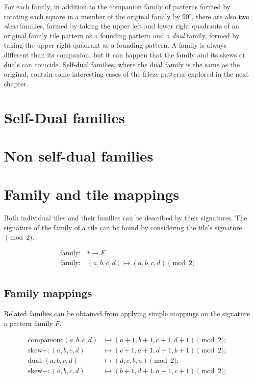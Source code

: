 \documentclass{tufte-book}
\begin{document}
\noindent
For each family, in addition to the companion family of patterns formed by rotating each square in a member of the original family by $90^{\circ}$,  there are also two \textit{skew} families, formed by taking the upper left and lower right quadrants of an original family tile pattern as a founding pattern and a \textit{dual} family, formed by taking the upper right quadrant as a founding pattern. A family is always different than its companion, but it can happen that the family and its skews or duals can coincide. Self-dual families, where the dual family is the same as the original, contain some interesting cases of the frieze patterns explored in the next chapter.

\section{Self-Dual families}


\section{Non self-dual families}


\newpage

\section{Family and tile mappings}
\marginnote{\centering} Both individual tiles and their families can be described by their signatures. The signature of the family of a tile can be found by considering the tile's signature $\pmod{2}$.

\begin{align*}        
\text{family}:& \, t \rightarrow F\\
\text{family}:& \, (a,b,c,d) \mapsto (a, b, c, d) \pmod{2}\\
\end{align*}

\subsection{Family mappings}
Related families can be obtained from applying simple mappings on the signature a pattern family $F$.

\begin{align*}        
\text{companion}: (a,b,c,d) &\mapsto (a+1, b+1, c+ 1, d+1) \pmod{2};\\
    \text{skew}+ : (a,b,c,d) &\mapsto (c+1, a+1, d+ 1, b+1) \pmod{2};\\
    \text{dual} : (a,b,c,d) &\mapsto (d, c, b, a) \pmod{2};\\
    \text{skew}- : (a,b,c,d) &\mapsto (b+1, d+1, a+ 1, c+1) \pmod{2};
\end{align*}
\end{document}
